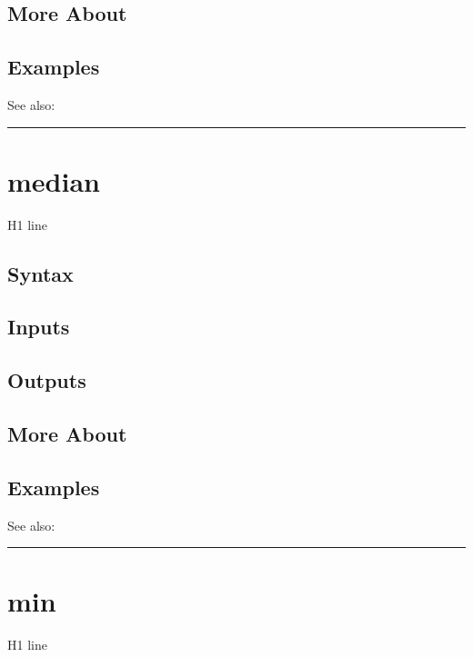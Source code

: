 \documentclass[letterpaper,10pt,english]{sphinxmanual}
\begin{document}
\subsection{More About}
\label{classes/time_series/@ts/ts:id353}

\subsection{Examples}
\label{classes/time_series/@ts/ts:id354}
See also:


\bigskip\hrule{}\bigskip



\section{median}
\label{classes/time_series/@ts/ts:median}\label{classes/time_series/@ts/ts:id355}
H1 line


\subsection{Syntax}
\label{classes/time_series/@ts/ts:id356}

\subsection{Inputs}
\label{classes/time_series/@ts/ts:id357}

\subsection{Outputs}
\label{classes/time_series/@ts/ts:id358}

\subsection{More About}
\label{classes/time_series/@ts/ts:id359}

\subsection{Examples}
\label{classes/time_series/@ts/ts:id360}
See also:


\bigskip\hrule{}\bigskip



\section{min}
\label{classes/time_series/@ts/ts:id361}\label{classes/time_series/@ts/ts:min}
H1 line
\end{document}
